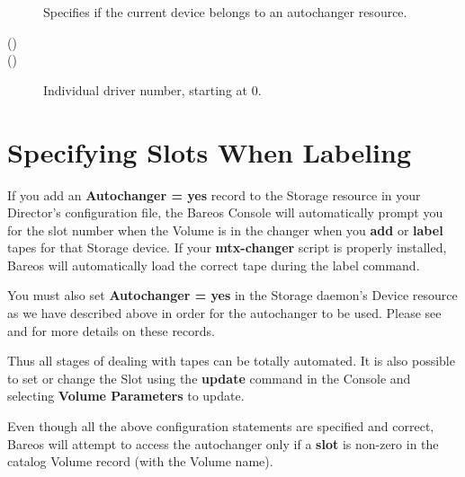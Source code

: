 \begin{description}
    \item[]
        Specifies if the current device belongs to an
        autochanger resource.

    \item[ ()]

    \item[ ()]

    \item[]
        Individual driver number, starting at 0.

    \item[]
\end{description}



\section{Specifying Slots When Labeling}
\label{SpecifyingSlots}

If you add an {\bf Autochanger = yes} record to the Storage resource in your
Director's configuration file, the Bareos Console will automatically prompt
you for the slot number when the Volume is in the changer when
you {\bf add} or {\bf label} tapes for that Storage device. If your
{\bf mtx-changer} script is properly installed, Bareos will automatically
load the correct tape during the label command.

You must also set
{\bf Autochanger = yes} in the Storage daemon's Device resource
as we have described above in order for the autochanger to be used.
Please see
and
for more details on these records.

Thus all stages of dealing with tapes can be totally automated. It is also
possible to set or change the Slot using the {\bf update} command in the
Console and selecting {\bf Volume Parameters} to update.

Even though all the above configuration statements are specified and correct,
Bareos will attempt to access the autochanger only if a {\bf slot} is non-zero
in the catalog Volume record (with the Volume name).

